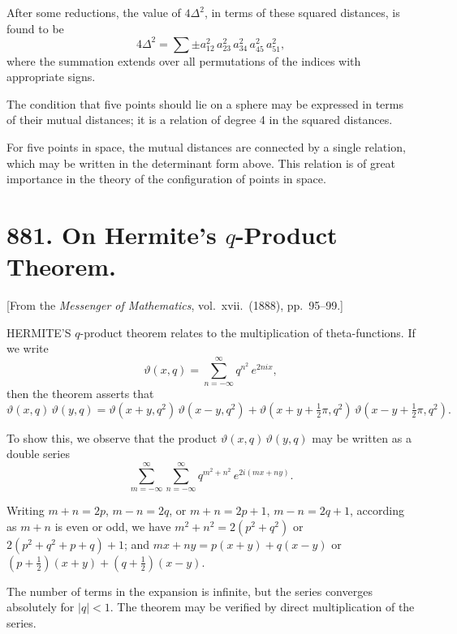 \documentclass[12pt,a4paper]{article}
\theoremstyle{plain}
\begin{document}
\medskip\noindent
After some reductions, the value of $4\Delta^{2}$, in terms of these squared distances, is found to be
\[
4\Delta^{2} = \sum \pm a_{12}^{2}\,a_{23}^{2}\,a_{34}^{2}\,a_{45}^{2}\,a_{51}^{2},
\]
where the summation extends over all permutations of the indices with appropriate signs.

The condition that five points should lie on a sphere may be expressed in terms of their mutual distances; it is a relation of degree 4 in the squared distances.

\medskip\noindent
For five points in space, the mutual distances are connected by a single relation, which may be written in the determinant form above. This relation is of great importance in the theory of the configuration of points in space.

\newpage
\section[881]{881. On Hermite's $q$-Product Theorem.}
\label{sec:881}

[From the \textit{Messenger of Mathematics}, vol.\ xvii.\ (1888), pp.\ 95--99.]

\medskip\noindent
HERMITE'S $q$-product theorem relates to the multiplication of theta-functions. If we write
\[
\vartheta(x, q) = \sum_{n=-\infty}^{\infty} q^{n^{2}}\,e^{2nix},
\]
then the theorem asserts that
\[
\vartheta(x, q)\,\vartheta(y, q) = \vartheta(x+y, q^{2})\,\vartheta(x-y, q^{2}) + \vartheta(x+y+\tfrac{1}{2}\pi, q^{2})\,\vartheta(x-y+\tfrac{1}{2}\pi, q^{2}).
\]

\medskip\noindent
To show this, we observe that the product $\vartheta(x, q)\,\vartheta(y, q)$ may be written as a double series
\[
\sum_{m=-\infty}^{\infty} \sum_{n=-\infty}^{\infty} q^{m^{2}+n^{2}}\,e^{2i(mx+ny)}.
\]

Writing $m + n = 2p$, $m - n = 2q$, or $m + n = 2p + 1$, $m - n = 2q + 1$, according as $m + n$ is even or odd, we have $m^{2} + n^{2} = 2(p^{2} + q^{2})$ or $2(p^{2} + q^{2} + p + q) + 1$; and $mx + ny = p(x+y) + q(x-y)$ or $(p + \tfrac{1}{2})(x+y) + (q + \tfrac{1}{2})(x-y)$.

\medskip\noindent
The number of terms in the expansion is infinite, but the series converges absolutely for $|q| < 1$. The theorem may be verified by direct multiplication of the series.
\end{document}
